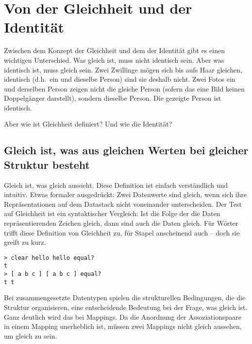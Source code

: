 \chapter{Von der Gleichheit und der Identität}
\label{Sec:GleichheitIdentitaet}

Zwischen dem Konzept der Gleichheit und dem der Identität gibt es einen wichtigen Unterschied. Was gleich ist, muss nicht identisch sein. Aber was identisch ist, muss gleich sein. Zwei Zwillinge mögen sich bis aufs Haar gleichen, identisch (d.h.\ ein und dieselbe Person) sind sie deshalb nicht. Zwei Fotos ein und derselben Person zeigen nicht die gleiche Person (sofern das eine Bild keinen Doppelgänger darstellt), sondern dieselbe Person. Die gezeigte Person ist identisch.


Aber wie ist Gleichheit definiert? Und wie die Identität?

\section{Gleich ist, was aus gleichen Werten bei gleicher Struktur besteht}

Gleich ist, was gleich aussieht. Diese Definition ist einfach verständlich und intuitiv.
Etwas formaler ausgedrückt: Zwei Datenwerte sind gleich, wenn sich ihre Repräsentationen auf dem Datastack nicht voneinander unterscheiden. Der Test auf Gleichheit ist ein syntaktischer Vergleich: Ist die Folge der die Daten repräsentierenden Zeichen gleich, dann sind auch die Daten gleich. Für Wörter trifft diese Definition von Gleichheit zu, für Stapel anscheinend auch -- doch sie greift zu kurz.

\begin{verbatim}
> clear hello hello equal?
t
> [ a b c ] [ a b c ] equal?
t t
\end{verbatim}

Bei zusammengesetzte Datentypen spielen die strukturellen Bedingungen, die die Struktur organisieren, eine entscheidende Bedeutung bei der Frage, was gleich ist.
Ganz deutlich wird das bei Mappings. Da die Anordnung der Assoziationspaare in einem Mapping unerheblich ist, müssen zwei Mappings nicht gleich aussehen, um gleich zu sein.

